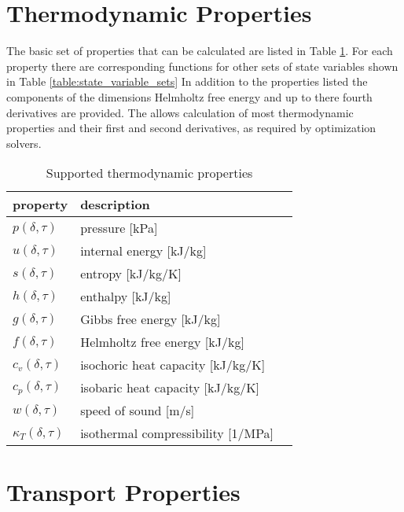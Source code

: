 \documentclass[oneside]{book}
\begin{document}
\section{Thermodynamic Properties}
 
The basic set of properties that can be calculated are listed in Table \ref{table:supported_properties}.  For each property there are corresponding functions for other sets of state variables shown in Table \ref{table:state_variable_sets} In addition to the properties listed the components of the dimensions Helmholtz free energy and up to there fourth derivatives are provided. The allows calculation of most thermodynamic properties and their first and second derivatives, as required by optimization solvers.  
 
\begin{table}[h!]
\centering
\caption{Supported thermodynamic properties}
\begin{tabular}{ l l l }
\hline
property & description  \\
\hline
\hline
$p(\delta, \tau)$ & pressure [kPa] \\ [1ex]
$u(\delta, \tau)$ & internal energy [kJ/kg] \\ [1ex]
$s(\delta, \tau)$ & entropy [kJ/kg/K] \\ [1ex]
$h(\delta, \tau)$ & enthalpy [kJ/kg] \\ [1ex]
$g(\delta, \tau)$ & Gibbs free energy [kJ/kg] \\ [1ex]
$f(\delta, \tau)$ & Helmholtz free energy [kJ/kg] \\ [1ex]
$c_v(\delta, \tau)$ & isochoric heat capacity [kJ/kg/K] \\ [1ex]
$c_p(\delta, \tau)$ & isobaric heat capacity [kJ/kg/K] \\ [1ex]
$w(\delta, \tau)$ & speed of sound [m/s] \\ [1ex]
$\kappa_T(\delta, \tau)$ & isothermal compressibility [1/MPa] \\ [1ex]
 \hline    
\end{tabular}
\label{table:supported_properties}
\end{table}

\clearpage

\section{Transport Properties}
 
\end{document}
